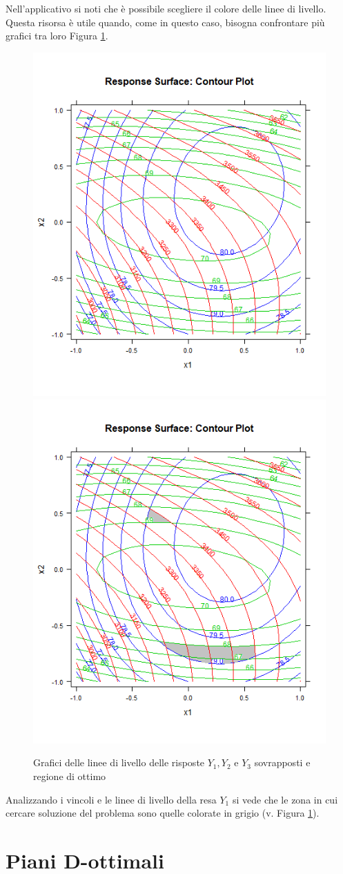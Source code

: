 \documentclass[
  11pt,
]{book}
\begin{document}
Nell'applicativo si noti che è possibile scegliere il colore delle linee di livello. Questa risorsa è utile quando, come in questo caso, bisogna confrontare più grafici tra loro Figura \ref{fig:ccd8}.

\begin{figure}[ht]
\includegraphics[width=0.5\linewidth]{Immagini/CCD/08_livelli} \includegraphics[width=0.5\linewidth]{Immagini/CCD/09_livelli} \caption{Grafici delle linee di livello delle risposte $Y_1,Y_2$ e $Y_3$ sovrapposti e regione di ottimo}\label{fig:ccd8}
\end{figure}

Analizzando i vincoli e le linee di livello della resa \(Y_1\) si vede che le zona in cui cercare soluzione del problema sono quelle colorate in grigio (v. Figura \ref{fig:ccd8}).

\hypertarget{piani-d-ottimali}{%
\chapter{Piani D-ottimali}\label{piani-d-ottimali}}
\end{document}
